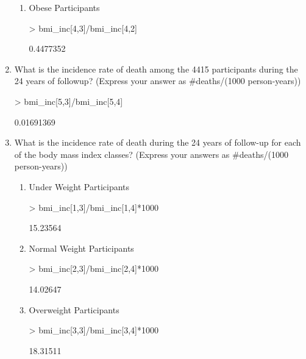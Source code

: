 \documentclass{article}
\begin{document}
\begin{enumerate}
\begin{enumerate}
\item Obese Participants

\begin{Schunk}
\begin{Sinput}
> bmi_inc[4,3]/bmi_inc[4,2]
\end{Sinput}
\begin{Soutput}
[1] 0.4477352
\end{Soutput}
\end{Schunk}
\end{enumerate}

\item What is the incidence rate of death among the 4415 participants during the 24 years of followup? (Express your answer as \#deaths/(1000 person-years))

\begin{Schunk}
\begin{Sinput}
> bmi_inc[5,3]/bmi_inc[5,4]
\end{Sinput}
\begin{Soutput}
[1] 0.01691369
\end{Soutput}
\end{Schunk}

\item What is the incidence rate of death during the 24 years of follow-up for each of the body mass index classes? (Express your answers as \#deaths/(1000 person-years))
\begin{enumerate}
\item Under Weight Participants
\begin{Schunk}
\begin{Sinput}
> bmi_inc[1,3]/bmi_inc[1,4]*1000
\end{Sinput}
\begin{Soutput}
[1] 15.23564
\end{Soutput}
\end{Schunk}

\item Normal Weight Participants
\begin{Schunk}
\begin{Sinput}
> bmi_inc[2,3]/bmi_inc[2,4]*1000
\end{Sinput}
\begin{Soutput}
[1] 14.02647
\end{Soutput}
\end{Schunk}
\item Overweight Participants

\begin{Schunk}
\begin{Sinput}
> bmi_inc[3,3]/bmi_inc[3,4]*1000
\end{Sinput}
\begin{Soutput}
[1] 18.31511
\end{Soutput}
\end{Schunk}


\end{enumerate}
\end{enumerate}
\end{document}
